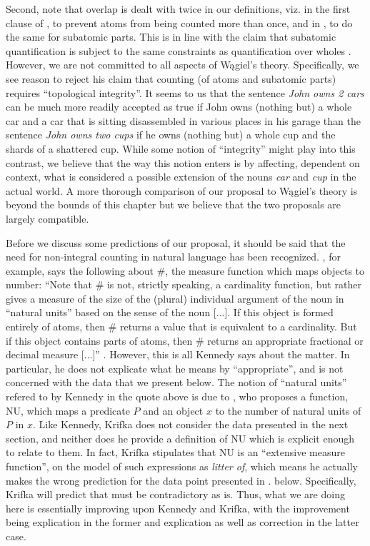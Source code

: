 \documentclass[output=paper]{langscibook}
\begin{document}
Second, note that overlap is dealt with twice in our definitions, viz. in the first clause of , to prevent atoms from being counted more than once, and in , to do the same for subatomic parts. This is in line with the claim that subatomic quantification is subject to the same constraints as quantification over wholes \citep{wagiel2018thesis, wagiel2019SuB}. However, we are not committed to all aspects of W\k{a}giel's theory. Specifically, we see reason to reject his claim that counting (of atoms and subatomic parts) requires ``topological integrity''. It seems to us that the sentence \textit{John owns 2 cars} can be much more readily accepted as true if John owns (nothing but) a whole car and a car that is sitting disassembled in various places in his garage than the sentence \textit{John owns two cups} if he owns (nothing but) a whole cup and the shards of a shattered cup. While some notion of ``integrity'' might play into this contrast, we believe that the way this notion enters is by affecting, dependent on context, what is considered a possible extension of the nouns \textit{car} and \textit{cup} in the actual world. A more thorough comparison of our proposal to W\k{a}giel's theory is beyond the bounds of this chapter but we believe that the two proposals are largely compatible.

Before we discuss some predictions of our proposal, it should be said that the need for non-integral counting in natural language has been recognized. \citet{kennedy2015de-fregean}, for example, says the following about \#, the measure function which maps objects to number: ``Note that \# is not, strictly speaking, a cardinality function, but rather gives a measure of the size of the (plural) individual argument of the noun in ``natural units'' based on the sense of the noun [...]. If this object is formed entirely of atoms, then \# returns a value that is equivalent to a cardinality. But if this object contains parts of atoms, then \# returns an appropriate fractional or decimal measure [...]'' \citep[][footnote 1]{kennedy2015de-fregean}. However, this is all Kennedy says about the matter. In particular, he does not explicate what he means by ``appropriate'', and is not concerned with the data that we present below. The notion of ``natural units'' refered to by Kennedy in the quote above is due to \citet{Krifka:1989}, who proposes a function, NU, which maps a predicate $P$ and an object $x$ to the number of natural units of $P$ in $x$. Like Kennedy, Krifka does not consider the data presented in the next section, and neither does he provide a definition of NU which is explicit enough to relate to them. In fact, Krifka stipulates that NU is an ``extensive measure function'', on the model of such expressions as \textit{litter of}, which means he actually makes the wrong prediction for the data point presented in . below. Specifically, Krifka will predict that  must be contradictory as  is. Thus, what we are doing here is essentially improving upon Kennedy and Krifka, with the improvement being explication in the former and explication as well as correction in the latter case.
\end{document}
